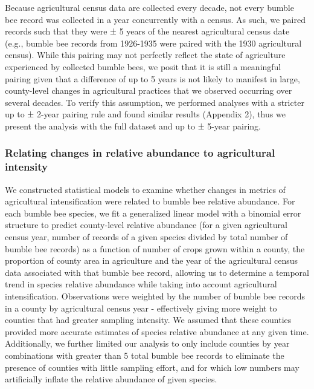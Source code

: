 \documentclass[11pt,]{article}
\begin{document}
Because agricultural census data are collected every decade, not every
bumble bee record was collected in a year concurrently with a census. As
such, we paired records such that they were ± 5 years of the nearest
agricultural census date (e.g., bumble bee records from 1926-1935 were
paired with the 1930 agricultural census). While this pairing may not
perfectly reflect the state of agriculture experienced by collected
bumble bees, we posit that it is still a meaningful pairing given that a
difference of up to 5 years is not likely to manifest in large,
county-level changes in agricultural practices that we observed
occurring over several decades. To verify this assumption, we performed
analyses with a stricter up to ± 2-year pairing rule and found similar
results (Appendix 2), thus we present the analysis with the full dataset
and up to ± 5-year pairing.

\hypertarget{relating-changes-in-relative-abundance-to-agricultural-intensity}{%
\subsubsection{Relating changes in relative abundance to agricultural
intensity}\label{relating-changes-in-relative-abundance-to-agricultural-intensity}}

We constructed statistical models to examine whether changes in metrics
of agricultural intensification were related to bumble bee relative
abundance. For each bumble bee species, we fit a generalized linear
model with a binomial error structure to predict county-level relative
abundance (for a given agricultural census year, number of records of a
given species divided by total number of bumble bee records) as a
function of number of crops grown within a county, the proportion of
county area in agriculture and the year of the agricultural census data
associated with that bumble bee record, allowing us to determine a
temporal trend in species relative abundance while taking into account
agricultural intensification. Observations were weighted by the number
of bumble bee records in a county by agricultural census year -
effectively giving more weight to counties that had greater sampling
intensity. We assumed that these counties provided more accurate
estimates of species relative abundance at any given time. Additionally,
we further limited our analysis to only include counties by year
combinations with greater than 5 total bumble bee records to eliminate
the presence of counties with little sampling effort, and for which low
numbers may artificially inflate the relative abundance of given
species.
\end{document}
